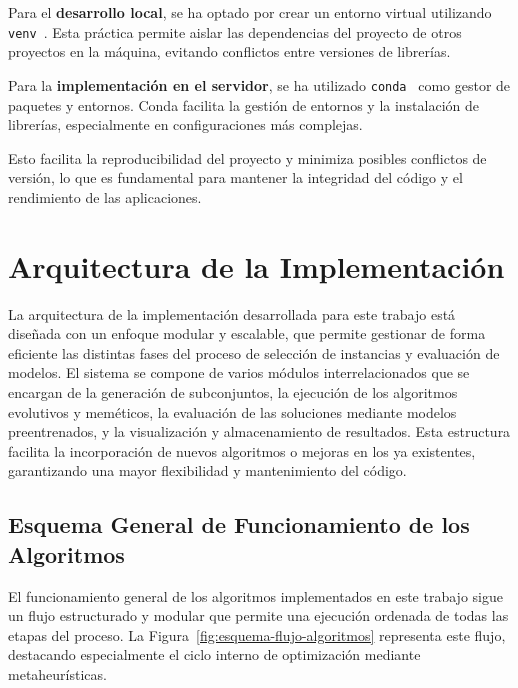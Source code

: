 Para el \textbf{desarrollo local}, se ha optado por crear un entorno virtual utilizando
\texttt{venv}~\cite{CreationVirtualEnvironments}.
Esta práctica permite aislar las dependencias del proyecto de otros proyectos en la máquina, evitando conflictos entre
versiones de librerías.

Para la \textbf{implementación en el servidor}, se ha utilizado \texttt{conda}~\cite{CondaDocumentation} como gestor
de paquetes y entornos.
Conda facilita la gestión de entornos y la instalación de librerías, especialmente en configuraciones más complejas.

Esto facilita la reproducibilidad del proyecto y minimiza posibles conflictos de versión, lo que es fundamental para
mantener la integridad del código y el rendimiento de las aplicaciones.


\section{Arquitectura de la Implementación}\label{sec:arquitectura-de-la-implementacion}
La arquitectura de la implementación desarrollada para este trabajo está diseñada con un enfoque modular y escalable,
que permite gestionar de forma eficiente las distintas fases del proceso de selección de instancias y evaluación de modelos.
El sistema se compone de varios módulos interrelacionados que se encargan de la generación de subconjuntos,
la ejecución de los algoritmos evolutivos y meméticos, la evaluación de las soluciones mediante modelos preentrenados, y la visualización y almacenamiento de resultados.
Esta estructura facilita la incorporación de nuevos algoritmos o mejoras en los ya existentes, garantizando una mayor flexibilidad y mantenimiento del código.

\subsection{Esquema General de Funcionamiento de los Algoritmos}\label{subsec:esquema-algoritmos}
El funcionamiento general de los algoritmos implementados en este trabajo sigue un flujo estructurado y modular que permite una ejecución ordenada de todas las etapas del proceso.
La Figura~\ref{fig:esquema-flujo-algoritmos} representa este flujo, destacando especialmente el ciclo interno de optimización mediante metaheurísticas.

